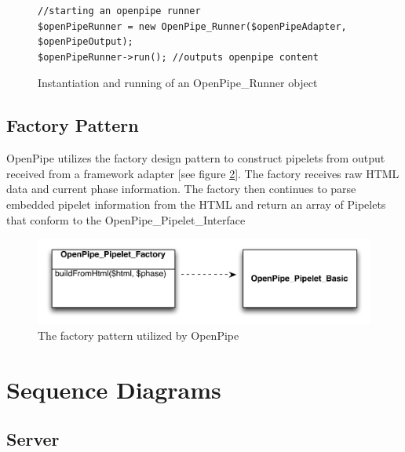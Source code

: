 \documentclass[12pt]{report}
\begin{document}
\begin{figure}[H]
\label{fig:strategyRunnerCode}
\begin{lstlisting}
//starting an openpipe runner
$openPipeRunner = new OpenPipe_Runner($openPipeAdapter, $openPipeOutput); 
$openPipeRunner->run(); //outputs openpipe content
\end{lstlisting}
\caption{Instantiation and running of an OpenPipe\_Runner object}
\end{figure}


\section{Factory Pattern}

OpenPipe utilizes the factory design pattern to construct pipelets from output received from a framework adapter [see figure \ref{fig:factoryPattern}]. The factory receives raw HTML data and current phase information. The factory then continues to parse embedded pipelet information from the HTML and return an array of Pipelets that conform to the OpenPipe\_Pipelet\_Interface 

\begin{figure}[H]
\label{fig:factoryPattern}
\centering
\includegraphics[width=\textwidth,keepaspectratio]{figures/images/factory_pipelets.pdf}
\caption{The factory pattern utilized by OpenPipe}
\end{figure}




\chapter{Sequence Diagrams}

\section{Server}
\end{document}
